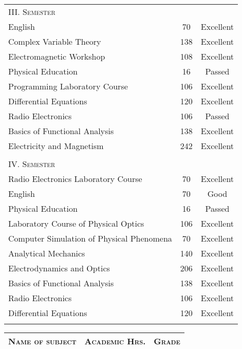 \documentclass[a4paper,12pt]{article}
\begin{document}
\begin{center}
\begin{tabular}{lcc}
\textsc{III. Semester}\\
English 	&70&	Excellent\\
Complex Variable Theory     &138	&Excellent\\
Electromagnetic Workshop    &108    &Excellent\\
Physical Education	        &16     &Passed\\
Programming Laboratory Course   &106    &Excellent\\
Differential Equations      &120    &Excellent\\
Radio Electronics   &106    &Passed\\
Basics of Functional Analysis   &138    &Excellent\\
Electricity and Magnetism    &242    &Excellent\\
\\


\textsc{IV. Semester}\\
Radio Electronics Laboratory Course &70 &Excellent\\
English     &70     &Good\\
Physical Education      &16     &Passed\\
Laboratory Course of Physical Optics    &106    &Excellent\\
Computer Simulation of Physical Phenomena   &70 &Excellent\\
Analytical Mechanics    &140    &Excellent\\
Electrodynamics and Optics  &206    &Excellent\\
Basics of Functional Analysis   &138    &Excellent\\
Radio Electronics   &106    &Excellent\\
Differential Equations      &120    &Excellent\\
\\
\end{tabular}

\begin{tabular}{lcc}
\multicolumn{1}{c}{\textsc{Name of subject}}&\textsc{Academic
Hrs.}&\textsc{Grade}\\ \hline


\end{tabular}
\end{center}
\end{document}
